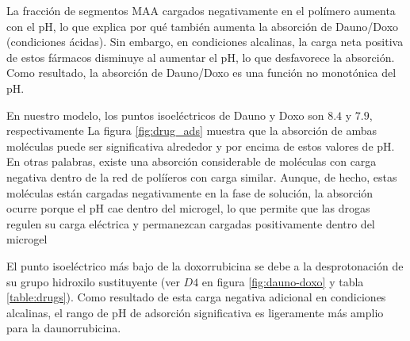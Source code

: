 La fracci\'on de segmentos MAA cargados negativamente en el pol\'imero aumenta con el pH, lo que explica por qu\'e tambi\'en aumenta la absorci\'on de Dauno/Doxo (condiciones \'acidas).
Sin embargo, en condiciones alcalinas, la carga neta positiva de estos f\'armacos disminuye al aumentar el pH, lo que desfavorece la absorci\'on.
Como resultado, la absorci\'on de Dauno/Doxo es una funci\'on no monot\'onica del pH.



En nuestro modelo, los puntos isoel\'ectricos de Dauno y Doxo son $8.4$ y $7.9$, respectivamente%
La figura \ref{fig:drug_ads} muestra que la absorci\'on de ambas mol\'eculas puede ser significativa alrededor y por encima de estos valores de pH.
En otras palabras, existe una absorci\'on considerable de mol\'eculas con carga negativa dentro de la red de polí\'ieros con carga similar.
Aunque, de hecho, estas mol\'eculas est\'an cargadas negativamente en la fase de soluci\'on, la absorci\'on ocurre porque el pH cae dentro del microgel, lo que permite que las drogas regulen su carga el\'ectrica y permanezcan cargadas positivamente dentro del microgel %


El punto isoel\'ectrico m\'as bajo de la doxorrubicina se debe a la desprotonaci\'on de su grupo hidroxilo sustituyente (ver $D4$ en figura \ref{fig:dauno-doxo} y tabla \ref{table:drugs}).
Como resultado de esta carga negativa adicional en condiciones alcalinas, el rango de pH de adsorci\'on significativa es ligeramente m\'as amplio para la daunorrubicina.